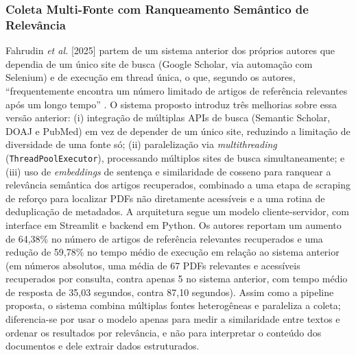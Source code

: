 \documentclass[12pt]{article}
\begin{document}
  \subsubsection{Coleta Multi-Fonte com Ranqueamento Semântico de Relevância}
  Fahrudin \emph{et al.} [2025] partem de um sistema anterior dos próprios autores que dependia de um único site de busca (Google Scholar, via automação com Selenium) e de execução em thread única, o que, segundo os autores, ``frequentemente encontra um número limitado de artigos de referência relevantes após um longo tempo'' \cite{b2}. O sistema proposto introduz três melhorias sobre essa versão anterior: (i) integração de múltiplas APIs de busca (Semantic Scholar, DOAJ e PubMed) em vez de depender de um único site, reduzindo a limitação de diversidade de uma fonte só; (ii) paralelização via \emph{multithreading} (\texttt{ThreadPoolExecutor}), processando múltiplos sites de busca simultaneamente; e (iii) uso de \emph{embeddings} de sentença e similaridade de cosseno para ranquear a relevância semântica dos artigos recuperados, combinado a uma etapa de scraping de reforço para localizar PDFs não diretamente acessíveis e a uma rotina de deduplicação de metadados. A arquitetura segue um modelo cliente-servidor, com interface em Streamlit e backend em Python. Os autores reportam um aumento de 64,38\% no número de artigos de referência relevantes recuperados e uma redução de 59,78\% no tempo médio de execução em relação ao sistema anterior (em números absolutos, uma média de 67 PDFs relevantes e acessíveis recuperados por consulta, contra apenas 5 no sistema anterior, com tempo médio de resposta de 35,03 segundos, contra 87,10 segundos). Assim como a pipeline proposta, o sistema combina múltiplas fontes heterogêneas e paraleliza a coleta; diferencia-se por usar o modelo apenas para medir a similaridade entre textos e ordenar os resultados por relevância, e não para interpretar o conteúdo dos documentos e dele extrair dados estruturados.
\end{document}

